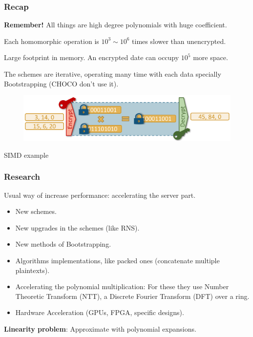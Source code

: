\documentclass[10pt,handout]{beamer}
\begin{document}
\begin{frame}
\frametitle{Recap}

    \textbf{Remember!} All things are high degree polynomials with huge coefficient.


Each homomorphic operation is $10^3 \sim 10^6$ times slower than unencrypted.
\pause

Large footprint in memory.
An encrypted date can occupy $10^5$ more space.

\pause
    The schemes are iterative, operating many time with each data specially Bootstrapping (CHOCO don't use it).

        \begin{figure}[h!]
            \centering
            \includegraphics[scale=0.8]{workflow.png}
        \end{figure}
    \centering
        SIMD example


\end{frame}


\begin{frame}
\frametitle{Research}

    Usual way of increase performance:  accelerating the server part.
\begin{itemize}\itemsep-0.7em
   \item New schemes.
   \item New upgrades in the schemes (like RNS).
   \item New methods of Bootstrapping.
   \item Algorithms implementations, like packed ones (concatenate multiple plaintexts).
   \item Accelerating the polynomial multiplication:
       For these they use Number Theoretic Transform (NTT), a Discrete Fourier Transform (DFT) over a ring.
   \item Hardware Acceleration (GPUs, FPGA, specific designs).
\end{itemize}

    \textbf{Linearity problem}: Approximate with polynomial expansions.
\end{frame}
\end{document}
